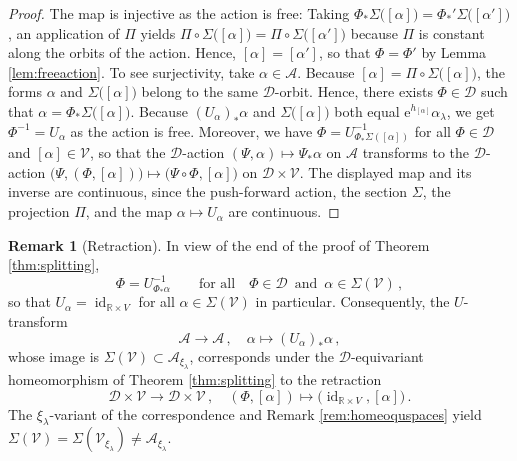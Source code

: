 \documentclass{amsart}
\theoremstyle{definition}
\newtheorem{rem}[prop]{Remark}
\newcommand{\AAA}{\mathcal A}
\newcommand{\DD}{\mathcal D}
\newcommand{\rme}{\mathrm e}
\newcommand{\R}{\mathbb R}
\newcommand{\VV}{\mathcal V}
\newcommand{\lra}{\longrightarrow}
\DeclareMathOperator{\id}{\mathrm{id}}
\begin{document}
\begin{proof}
The map is injective as the action is free:
Taking
$\Phi_*\Sigma\big([\alpha]\big)=\Phi_*'\Sigma\big([\alpha']\big)$,
an application of $\Pi$ yields
$\Pi\circ\Sigma\big([\alpha]\big)=\Pi\circ\Sigma\big([\alpha']\big)$
because $\Pi$ is constant along the orbits of the action.
Hence, $[\alpha]=[\alpha']$,
so that $\Phi=\Phi'$ by Lemma \ref{lem:freeaction}.
To see surjectivity, take $\alpha\in\AAA$.
Because
$[\alpha]=\Pi\circ\Sigma\big([\alpha]\big)$,
the forms $\alpha$ and $\Sigma\big([\alpha]\big)$
belong to the same $\DD$-orbit.
Hence, there exists $\Phi\in\DD$ such that
$\alpha=\Phi_*\Sigma\big([\alpha]\big)$.
Because $(U_{\alpha})_*\alpha$ and
$\Sigma\big([\alpha]\big)$ both equal
$\rme^{h_{[\alpha]}}\alpha_{\lambda}$,
we get $\Phi^{-1}=U_{\alpha}$ as the action is free.
Moreover,
we have $\Phi=U_{\Phi_*\Sigma([\alpha])}^{-1}$
for all $\Phi\in\DD$ and $[\alpha]\in\VV$,
so that the $\DD$-action
$(\Psi,\alpha)\mapsto\Psi_*\alpha$ on $\AAA$
transforms to the $\DD$-action
  $
  \big(\Psi,(\Phi,[\alpha])\big)
  \mapsto
  \big(\Psi\circ\Phi,[\alpha]\big)
  $
on $\DD\times\VV$.
The displayed map and its inverse are continuous,
since the push-forward action, the section $\Sigma$,
the projection $\Pi$, and the map
$\alpha\mapsto U_{\alpha}$ are continuous.
\end{proof}


\begin{rem}[Retraction]
\label{rem:retraction}
In view of the end of the proof
of Theorem \ref{thm:splitting},
\[
  \Phi=U_{\Phi_*\alpha}^{-1}
  \qquad\text{for all}\quad
  \Phi\in\DD
  \,\,\,\text{and}\,\,\,
  \alpha\in\Sigma(\VV)
  \,,
\]
so that $U_{\alpha}=\id_{\R\times V}$
for all $\alpha\in\Sigma(\VV)$ in particular.
Consequently, the $U$-transform
  \[
  \AAA\lra\AAA
  \,,
  \quad
  \alpha\longmapsto
  (U_{\alpha})_*\alpha
  \,,
  \]
whose image is
$\Sigma(\VV)\subset\AAA_{\xi_{\lambda}}$,
corresponds under the $\DD$-equivariant homeomorphism
of Theorem \ref{thm:splitting} to the retraction
  \[
  \DD\times\VV\lra\DD\times\VV
  \,,
  \quad
  (\Phi,[\alpha])\longmapsto
  \big(\!\id_{\R\times V},[\alpha]\big)
  \,.
  \]
The $\xi_{\lambda}$-variant of the correspondence
and Remark \ref{rem:homeoquspaces} yield
$\Sigma(\VV)=
\Sigma(\VV_{\xi_{\lambda}})\neq
\AAA_{\xi_{\lambda}}$.
\end{rem}
\end{document}
